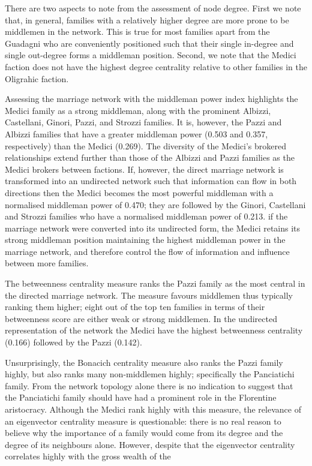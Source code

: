 \documentclass[11pt,fleqn]{article}
\begin{document}
There are two aspects to note from the assessment of node degree. First we note that, in general, families with a relatively higher degree are more prone to be middlemen in the network. This is true for most families apart from the Guadagni who are conveniently positioned such that their single in-degree and single out-degree forms a middleman position. Second, we note that the Medici faction does not have the highest degree centrality relative to other families in the Oligrahic faction.

Assessing the marriage network with the middleman power index highlights the Medici family as a strong middleman, along with the prominent Albizzi, Castellani, Ginori, Pazzi, and Strozzi families. It is, however, the Pazzi and Albizzi families that have a greater middleman power (0.503 and 0.357, respectively) than the Medici (0.269). The diversity of the Medici's brokered relationships extend further than those of the Albizzi and Pazzi families as the Medici brokers between factions. If, however, the direct marriage network is transformed into an undirected network such that information can flow in both directions then the Medici becomes the most powerful middleman with a normalised middleman power of 0.470; they are followed by the Ginori, Castellani and Strozzi families who have a normalised middleman power of 0.213. if the marriage network were converted into its undirected form, the Medici retains its strong middleman position maintaining the highest middleman power in the marriage network, and therefore control the flow of information and influence between more families.

The betweenness centrality measure ranks the Pazzi family as the most central in the directed marriage network. The measure favours middlemen thus typically ranking them higher; eight out of the top ten families in terms of their betweenness score are either weak or strong middlemen. In the undirected representation of the network the Medici have the highest betweenness centrality (0.166) followed by the Pazzi (0.142).

Unsurprisingly, the Bonacich centrality measure also ranks the Pazzi family highly, but also ranks many non-middlemen highly; specifically the Panciatichi family. From the network topology alone there is no indication to suggest that the Panciatichi family should have had a prominent role in the Florentine aristocracy. Although the Medici rank highly with this measure, the relevance of an eigenvector centrality measure is questionable: there is no real reason to believe why the importance of a family would come from its degree and the degree of its neighbours alone. However, despite that the eigenvector centrality correlates highly with the gross wealth of the 
\end{document}
